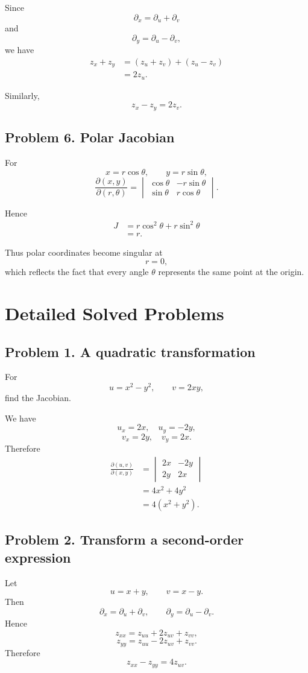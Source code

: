 \documentclass[11pt,oneside]{book}
\theoremstyle{studentthm}
\theoremstyle{definition}
\begin{document}
Since
\[
\partial_x=\partial_u+\partial_v
\]
and
\[
\partial_y=\partial_u-\partial_v,
\]
we have
\[
\begin{aligned}
z_x+z_y
&=
(z_u+z_v)+(z_u-z_v)\\
&=
2z_u.
\end{aligned}
\]

Similarly,
\[
z_x-z_y=2z_v.
\]

\subsection*{Problem 6. Polar Jacobian}

For
\[
x=r\cos\theta,\qquad y=r\sin\theta,
\]
\[
\frac{\partial(x,y)}{\partial(r,\theta)}
=
\begin{vmatrix}
\cos\theta&-r\sin\theta\\
\sin\theta&r\cos\theta
\end{vmatrix}.
\]

Hence
\[
\begin{aligned}
J
&=
r\cos^2\theta+r\sin^2\theta\\
&=
r.
\end{aligned}
\]

Thus polar coordinates become singular at
\[
r=0,
\]
which reflects the fact that every angle \(\theta\) represents the same
point at the origin.


\section{Detailed Solved Problems}

\subsection*{Problem 1. A quadratic transformation}
For
\[
u=x^2-y^2,
\qquad
v=2xy,
\]
find the Jacobian.

We have
\[
u_x=2x,\quad u_y=-2y,
\]
\[
v_x=2y,\quad v_y=2x.
\]
Therefore
\[
\begin{aligned}
\frac{\partial(u,v)}{\partial(x,y)}
&=
\begin{vmatrix}
2x&-2y\\
2y&2x
\end{vmatrix}\\
&=
4x^2+4y^2\\
&=
4(x^2+y^2).
\end{aligned}
\]

\subsection*{Problem 2. Transform a second-order expression}
Let
\[
u=x+y,\qquad v=x-y.
\]
Then
\[
\partial_x=\partial_u+\partial_v,
\qquad
\partial_y=\partial_u-\partial_v.
\]
Hence
\[
z_{xx}
=
z_{uu}+2z_{uv}+z_{vv},
\]
\[
z_{yy}
=
z_{uu}-2z_{uv}+z_{vv}.
\]
Therefore
\[
z_{xx}-z_{yy}=4z_{uv}.
\]
\end{document}

